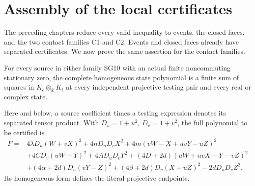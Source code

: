 \chapter{Assembly of the local certificates}
\label{ch:cover}
\label{component:pe1088004af65}
\label{pe1088004af65:sec:complete-source-routing}

The preceding chapters reduce every valid inequality to events, the
closed faces, and the two contact families C1 and C2. Events and closed
faces already have separated certificates. We now prove the same
assertion for the contact families.

\begin{theorem}
For every source in either family SG10 with an actual finite
noncommuting stationary zero, the complete homogeneous state polynomial
is a finite sum of squares in $K_c\otimes_{\mathbb R}K_t$ at every
independent projective testing pair and every real or complex state.
\end{theorem}

Here and below, a source coefficient times a testing expression denotes
its separated tensor product. With $D_u=1+u^2$, $D_v=1+v^2$, the full
polynomial to be certified is
\[
\begin{split}
 F={}&4\lambda D_u(W+vX)^2+4nD_uD_vX^2
       +4m(vW-X+uvY-uZ)^2\\
 &+4CD_v(uW-Y)^2+4AD_uD_vY^2
       +(4D+2d)(uW+uvX-Y-vZ)^2\\
 &+(4\alpha+2d)D_u(vY-Z)^2
       +(4\beta+2d)D_v(X+uZ)^2-2dD_uD_vZ^2.
\end{split}\tag{LC2}
\]
Its homogeneous form defines the literal projective endpoints.

